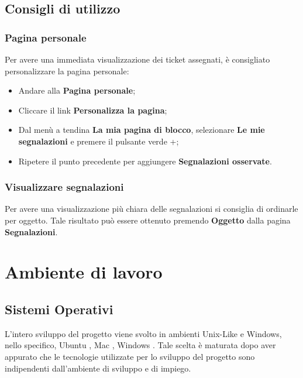 \documentclass[a4paper,12pt]{article}
\begin{document}
\subsection{Consigli di utilizzo}
{ 
\subsubsection{Pagina personale}
{ 
	Per avere una immediata visualizzazione dei ticket assegnati, è consigliato personalizzare 
	la pagina personale: 
	\begin{itemize}
		\item Andare alla \textbf{Pagina personale}; 
		\item Cliccare il link \textbf{Personalizza la pagina}; 
		\item Dal menù a tendina \textbf{La mia pagina di blocco}, selezionare \textbf{Le mie segnalazioni} 
		e premere il pulsante verde +; 
		\item Ripetere il punto precedente per aggiungere \textbf{Segnalazioni osservate}. 
	
	\end{itemize}

	
\subsubsection{Visualizzare segnalazioni}
{ 
	Per avere una visualizzazione più chiara delle segnalazioni si consiglia di ordinarle per 
	oggetto. Tale risultato può essere ottenuto premendo \textbf{Oggetto} dalla pagina \textbf{Segnalazioni}.
}
}
}

\section{Ambiente di lavoro} 

\subsection{Sistemi Operativi}
{
L’intero sviluppo del progetto viene svolto in ambienti Unix-Like e Windows, nello specifico, Ubuntu , Mac , Windows . Tale scelta è maturata dopo aver appurato che le tecnologie utilizzate per lo sviluppo del progetto sono indipendenti dall’ambiente di sviluppo e di impiego.
}
\end{document}
